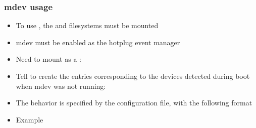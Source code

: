 \begin{frame}
  \frametitle{mdev usage}
  \begin{itemize}
  \item To use , the  and  filesystems must be mounted
  \item mdev must be enabled as the hotplug event manager\\
  \item Need to mount  as a :\\
  \item Tell  to create the  entries
    corresponding to the devices detected
    during boot when mdev was not running:\\
  \item The behavior is specified by the  configuration
    file, with the following format\\
  \item Example\\
  \end{itemize}
\end{frame}

